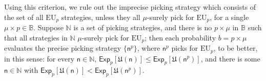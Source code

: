 \documentclass[a4paper]{article}
\renewcommand\P{\mathbb{P}} %
\newcommand\Exp{\mathsf{Exp}}
\newcommand\EU{\mathrm{EU}}
\newcommand\EAd{\mathrm{EAd}}
\newcommand\U{\mathfrak{U}} %
\newcommand{\n}{\mathsf{n}}
\newcommand{\imprecpickstrat}{\mathbb{N}}
\newcommand{\IB}{\mathbb{B}}
\newcommand{\IP}{\P}
\newcommand{\todoold}[2][]{\todo[backgroundcolor=white,bordercolor=orange!10,linecolor=gray!10, #1,caption={},textcolor=gray]{Pre-rev: #2}}
\newcommand{\todooldinfo}[2][]{\todoold[#1]{#2}}
\renewcommand{\leq}{\leqslant}
\newenvironment{CCM rewritten}
{\begingroup\color{blue}} %
{\endgroup}              %
\begin{document}
	Using this criterion, we rule out the imprecise picking strategy which consists of the set of all $\EU_p$ strategies, unless they all $\mu$-surely pick for $\EU_p$, for a single $\mu\times p\in\IB$. 
	Suppose $\imprecpickstrat$ is a set of picking strategies, and there is no $p \times \mu$ in $\IB$ such that all strategies in $\imprecpickstrat$ $\mu$-surely pick for $\EU_p$; then each probability $b=p\times \mu$ evaluates the precise picking strategy $\{\n^p\}$, where $\n^p$ picks for $\EU_p$, to be better, in this sense: for every $\n\in\imprecpickstrat$, $\Exp_p[\U(\n)]\leq \Exp_p[\U(\n^p)]$, and there is some $\n\in\imprecpickstrat$ with $\Exp_p[\U(\n)]<\Exp_p[\U(\n^p)]$. 
%	 
	
\end{document}
